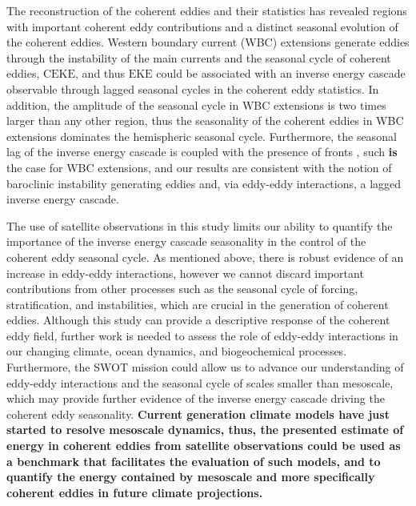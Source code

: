 \documentclass[draft,linenumbers]{agujournal2019}
\newcommand{\EKE}{\textrm{EKE}}
\newcommand{\CEKE}{\textrm{CEKE}}
\begin{document}
	The reconstruction of the coherent eddies and their statistics has revealed regions with important coherent eddy contributions and a distinct seasonal evolution of the coherent eddies. 
	Western boundary current (WBC) extensions generate eddies through the instability of the main currents and the seasonal cycle of coherent eddies, $\CEKE$, and thus $\EKE$ could be associated with an inverse energy cascade observable through lagged seasonal cycles in the coherent eddy statistics. 
	In addition, the amplitude of the seasonal cycle in WBC extensions is two times larger than any other region, thus the seasonality of the coherent eddies in WBC extensions dominates the hemispheric seasonal cycle. 
	Furthermore, the seasonal lag of the inverse energy cascade is coupled with the presence of fronts \citep{Qiu_seasonal_2014}, such \textbf{is} the case for WBC extensions, and our results are consistent with the notion of baroclinic instability generating eddies and, via eddy-eddy interactions, a lagged inverse energy cascade.
	
	The use of satellite observations in this study limits our ability to quantify the importance of the inverse energy cascade seasonality in the control of the coherent eddy seasonal cycle. 
	As mentioned above, there is robust evidence of an increase in eddy-eddy interactions, however we cannot discard important contributions from other processes such as the seasonal cycle of forcing, stratification, and instabilities, which are crucial in the generation of coherent eddies. Although this study can provide a descriptive response of the coherent eddy field, further work is needed to assess the role of eddy-eddy interactions in our changing climate, ocean dynamics, and biogeochemical processes. Furthermore, the SWOT mission could allow us to advance our understanding of eddy-eddy interactions and the seasonal cycle of scales smaller than mesoscale, which may provide further evidence of the inverse energy cascade driving the coherent eddy seasonality. \textbf{Current generation climate models have just started to resolve mesoscale dynamics, thus, the presented estimate of energy in coherent eddies from satellite observations could be used as a benchmark that facilitates the evaluation of such models, and to quantify the energy contained by mesoscale and more specifically coherent eddies in future climate projections.}
\end{document}
